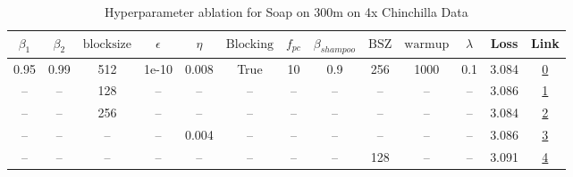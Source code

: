 \begin{table}[H]
\centering
\caption{Hyperparameter ablation for Soap on 300m on 4x Chinchilla Data}
\label{tab:ablation_soap_300m_4}
\begin{tabular}{ccccccccccccc}
\toprule
$\beta_1$ & $\beta_2$ & $\mathrm{block size}$ & $\epsilon$ & $\eta$ & $\mathrm{Blocking}$ & $f_{pc}$ & $\beta_{shampoo}$ & $\mathrm{BSZ}$ & $\mathrm{warmup}$ & $\lambda$ & Loss & Link \\
\midrule
0.95 & 0.99 & 512 & 1e-10 & 0.008 & True & 10 & 0.9 & 256 & 1000 & 0.1 & 3.084 & \href{https://wandb.ai/stanford-mercury/optimizer-scaling/runs/sweep-300m-24B-soapeie4b166lr0.008-wd0.1-minlr0-warmup1000-b10.9-9894a6}{0} \\
\midrule
-- & -- & 128 & -- & -- & -- & -- & -- & -- & -- & -- & 3.086 & \href{https://wandb.ai/stanford-mercury/optimizer-scaling/runs/sweep-300m-24B-soapeib93333lr0.008-wd0.1-minlr0-warmup1000-b10.9-811046}{1} \\
-- & -- & 256 & -- & -- & -- & -- & -- & -- & -- & -- & 3.084 & \href{https://wandb.ai/stanford-mercury/optimizer-scaling/runs/sweep-300m-24B-soapei1f2d4flr0.008-wd0.1-minlr0-warmup1000-b10.9-63b43e}{2} \\
-- & -- & -- & -- & 0.004 & -- & -- & -- & -- & -- & -- & 3.086 & \href{https://wandb.ai/stanford-mercury/optimizer-scaling/runs/sweep-300m-24B-soapei97cdfclr0.004-wd0.1-minlr0-warmup1000-b10.9-97c1bf}{3} \\
-- & -- & -- & -- & -- & -- & -- & -- & 128 & -- & -- & 3.091 & \href{https://wandb.ai/stanford-mercury/optimizer-scaling/runs/sweep-300m-24B-soapeie57080lr0.008-wd0.1-minlr0-warmup1000-b10.9-7a725d}{4} \\
\bottomrule
\end{tabular}
\end{table}


